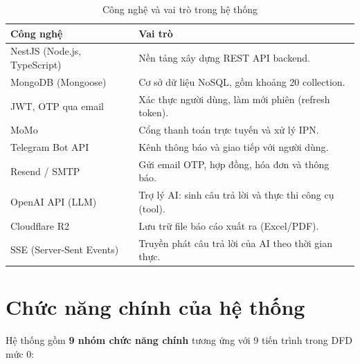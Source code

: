 \documentclass[12pt,a4paper]{report}
\begin{document}
\begin{table}[H]
  \centering
  \caption{Công nghệ và vai trò trong hệ thống}
  \begin{tabular}{@{}p{5.6cm}p{8.4cm}@{}}
    \toprule
    \textbf{Công nghệ} & \textbf{Vai trò} \\
    \midrule
    NestJS (Node.js, TypeScript) & Nền tảng xây dựng REST API backend. \\
    \addlinespace
    MongoDB (Mongoose) & Cơ sở dữ liệu NoSQL, gồm khoảng 20 collection. \\
    \addlinespace
    JWT, OTP qua email & Xác thực người dùng, làm mới phiên (refresh token). \\
    \addlinespace
    MoMo & Cổng thanh toán trực tuyến và xử lý IPN. \\
    \addlinespace
    Telegram Bot API & Kênh thông báo và giao tiếp với người dùng. \\
    \addlinespace
    Resend / SMTP & Gửi email OTP, hợp đồng, hóa đơn và thông báo. \\
    \addlinespace
    OpenAI API (LLM) & Trợ lý AI: sinh câu trả lời và thực thi công cụ (tool). \\
    \addlinespace
    Cloudflare R2 & Lưu trữ file báo cáo xuất ra (Excel/PDF). \\
    \addlinespace
    SSE (Server-Sent Events) & Truyền phát câu trả lời của AI theo thời gian thực. \\
    \bottomrule
  \end{tabular}
\end{table}

\section{Chức năng chính của hệ thống}

Hệ thống gồm \textbf{9 nhóm chức năng chính} tương ứng với 9 tiến trình trong DFD mức 0:
\end{document}
